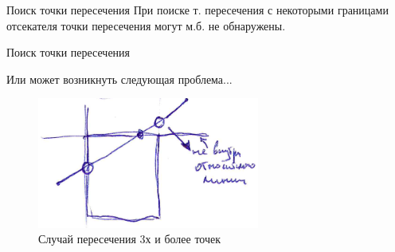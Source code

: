\documentclass{beamer}
\begin{document}
\begin{frame}{Поиск точки пересечения}
{		При поиске т. пересечения с некоторыми границами отсекателя 
	точки пересечения могут м.б. не обнаружены.
		}

	\end{frame}

	\begin{frame}{Поиск точки пересечения}

		Или может возникнуть следующая проблема...
		\begin{figure} 
			\includegraphics[width=0.65\textwidth]{images/example7.png}
			\caption{Случай пересечения 3х и более точек}
		\end{figure}
		

	\end{frame}
\end{document}
